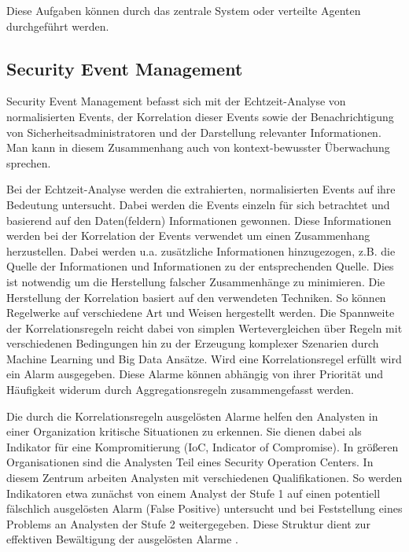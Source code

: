 Diese Aufgaben können durch das zentrale System oder verteilte Agenten durchgeführt werden. 

\subsection{Security Event Management}
\label{cha:Security Event Management}

Security Event Management befasst sich mit der Echtzeit-Analyse von normalisierten Events, der Korrelation dieser Events sowie der Benachrichtigung von Sicherheitsadministratoren und der Darstellung relevanter Informationen. Man kann in diesem Zusammenhang auch von kontext-bewusster Überwachung sprechen. %

Bei der Echtzeit-Analyse werden die extrahierten, normalisierten Events auf ihre Bedeutung untersucht. Dabei werden die Events einzeln für sich betrachtet und basierend auf den Daten(feldern) Informationen gewonnen. Diese Informationen werden bei der Korrelation der Events verwendet um einen Zusammenhang herzustellen. Dabei werden u.a. zusätzliche Informationen hinzugezogen, z.B. die Quelle der Informationen und Informationen zu der entsprechenden Quelle.
Dies ist notwendig um die Herstellung falscher Zusammenhänge zu minimieren. Die Herstellung der Korrelation basiert auf den verwendeten Techniken. So können Regelwerke auf verschiedene Art und Weisen hergestellt werden. Die Spannweite der Korrelationsregeln reicht dabei von simplen Wertevergleichen über Regeln mit verschiedenen Bedingungen hin zu der Erzeugung komplexer Szenarien durch Machine Learning und Big Data Ansätze. Wird eine Korrelationsregel erfüllt wird ein Alarm ausgegeben. Diese Alarme können abhängig von ihrer Priorität und Häufigkeit widerum durch Aggregationsregeln zusammengefasst werden.

Die durch die Korrelationsregeln ausgelösten Alarme helfen den Analysten in einer Organization kritische Situationen zu erkennen. Sie dienen dabei als Indikator für eine Kompromitierung (IoC, Indicator of Compromise). In größeren Organisationen sind die Analysten Teil eines \glqq Security Operation Centers\grqq  . In diesem Zentrum arbeiten Analysten mit verschiedenen Qualifikationen. So werden Indikatoren etwa zunächst von einem Analyst der Stufe 1 auf einen potentiell fälschlich ausgelösten Alarm (False Positive) untersucht und bei Feststellung eines Problems an Analysten der Stufe 2 weitergegeben. Diese Struktur dient zur effektiven Bewältigung der ausgelösten Alarme \citep{6924640}.


